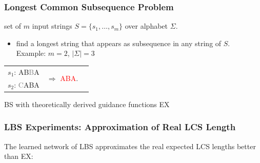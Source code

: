 \documentclass[aspectratio=1610]{beamer}
\begin{document}
\begin{frame}%
	\frametitle{Longest Common Subsequence Problem}
	
	\medskip
	
	 set of $m$ input strings $S = \{s_1 , \ldots, s_m \}$ over alphabet $\Sigma$.
	
	\medskip
	
	\begin{itemize}
		\item {} find a longest string that appears as subsequence in any string of $S$. \\ \medskip
		Example: $m=2$, $|\Sigma|=3$
	\end{itemize}
	\begin{center}
	\begin{tabular}{ccc}
		$s_1$: AB\textcolor{gray}{B}A & \multirow{2}{*}{$\Rightarrow$ \textcolor{red}{ABA}.}\\
		$s_2$: \textcolor{gray}{C}ABA
	\end{tabular}
	\end{center}
	

	\bigskip
	 BS with theoretically derived guidance functions EX\\ \citep{djukanovic-19b}
\end{frame}

\begin{frame}
	\frametitle{LBS Experiments: Approximation of Real LCS Length}
	
	The learned network of LBS approximates the real expected LCS lengths better than EX:

	\bigskip
	\begin{center}
		
	\end{center}
	
	
\end{frame}
	
\end{document}
